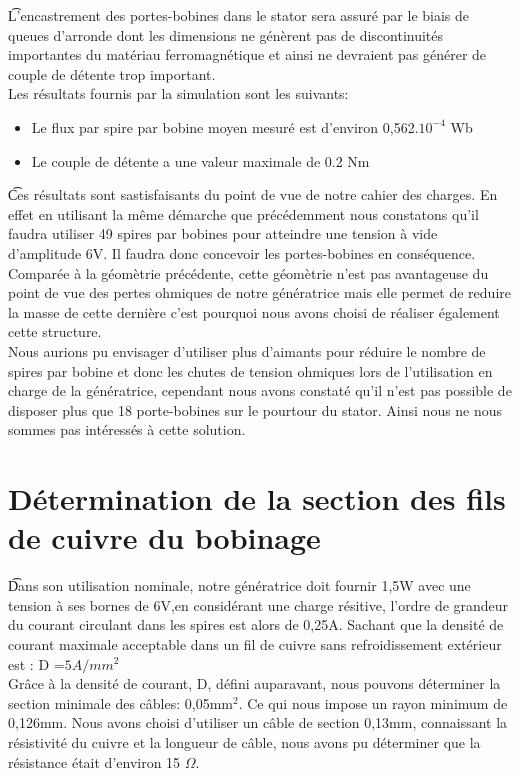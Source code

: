 \documentclass[a4paper,12pt]{article} %
\begin{document}
\t L'encastrement des portes-bobines dans le stator sera assuré par le biais de queues d'arronde dont les dimensions ne génèrent pas de discontinuités importantes du matériau ferromagnétique et ainsi ne devraient pas générer de couple de détente trop important.
\\Les résultats fournis par la simulation sont les suivants:
\begin{itemize}
\item Le flux par spire par bobine moyen mesuré est d'environ 0,562.\(10^{-4}\) Wb
\item Le couple de détente a une valeur maximale de  0.2 Nm
\end{itemize}
\t Ces résultats sont sastisfaisants du point de vue de notre cahier des charges.
En effet en utilisant la même démarche que précédemment nous constatons qu'il faudra utiliser 49 spires par bobines pour atteindre une tension à vide d'amplitude 6V. Il faudra donc concevoir les portes-bobines en conséquence. Comparée à la géomètrie précédente, cette géomètrie n'est pas avantageuse du point de vue des pertes ohmiques de notre génératrice mais elle permet de reduire la masse de cette dernière c'est pourquoi nous avons choisi de réaliser également cette structure.\\

Nous aurions pu envisager d'utiliser plus d'aimants pour réduire le nombre de spires par bobine et donc les chutes de tension ohmiques lors de l'utilisation en charge de la génératrice, cependant nous avons constaté qu'il n'est pas possible de disposer plus que 18 porte-bobines sur le pourtour du stator. Ainsi nous ne nous sommes pas intéressés à cette solution.

\section{Détermination de la section des fils de cuivre du bobinage}

\t Dans son utilisation nominale, notre génératrice doit fournir 1,5W avec une tension à ses bornes de 6V,en considérant une charge résitive, l'ordre de grandeur du courant circulant dans les spires est alors de 0,25A. Sachant que la densité de courant maximale acceptable dans un fil de cuivre sans refroidissement extérieur est : D =$5A/mm^2$\\


Grâce à la densité de courant, D, défini auparavant, nous pouvons déterminer la section minimale des câbles: 0,05mm$^2$. Ce qui nous impose un rayon minimum de 0,126mm. Nous avons choisi d'utiliser un câble de section 0,13mm, connaissant la résistivité du cuivre et la longueur de câble, nous avons pu déterminer que la résistance était d'environ 15 $\Omega$.
\end{document}
